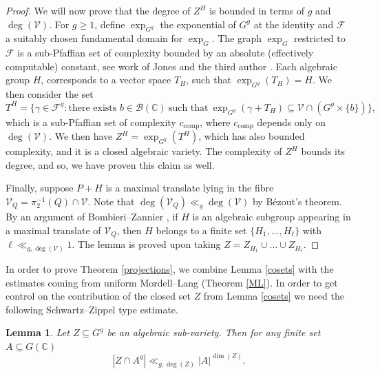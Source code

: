 \documentclass[12pt, reqno]{amsart}
\newcommand{\C}{\mathbb{C}}
\newtheorem{lem}[theorem]{Lemma}
\theoremstyle{remark}
\theoremstyle{definition}
\numberwithin{equation}{section}
\begin{document}
\begin{proof}
We will now prove that the degree of $Z^H$ is bounded in terms of $g$ and $\deg(\mathcal{V})$. For $g \geq 1$,  define $\exp_{G^g}$ the exponential of $G^g$ at the identity and $\mathcal{F}$ a suitably chosen fundamental domain for $\exp_G$. The graph $\exp_G$ restricted to $\mathcal{F}$ is a sub-Pfaffian set of complexity bounded by an absolute (effectively computable) constant, see work of Jones and the third author \cite{pfaffian}. Each algebraic group $H$, corresponds to a vector space $T_H$, such that $\exp_{G^g}(T_H) = H$. We then consider the set 
$$T^H = \{\gamma \in \mathcal{F}^g : \text{there exists } b \in \mathcal{B}(\C) \ \text{such that} \ \exp_{G^g}(\gamma  + T_H) \subseteq \mathcal{V} \cap ( G^g \times \{b\}) \},$$
which is a sub-Pfaffian set of complexity $c_{\text{comp}}$, where $c_{\text{comp}}$ depends only on $\deg(\mathcal{V})$.  We then have 
$Z^H = \exp_{G^{g}}(T^H)$, which has also bounded complexity, and it is a closed algebraic variety. The complexity of $Z^H$ bounds its degree, and so, we have proven this claim as well.

Finally, suppose $P + H$ is a maximal translate lying in the fibre $\mathcal{V}_Q = \pi_2^{-1}(Q)\cap \mathcal{V}$. Note that $\deg(\mathcal{V}_Q) \ll_g \deg(\mathcal{V})$ by B{\' e}zout's theorem. By an argument of Bombieri--Zannier \cite[Lemma 2]{Bombieri--Zannier}, if $H$ is an algebraic subgroup appearing in a maximal translate of $\mathcal{V}_Q$, then $H$ belongs to a finite set $\{H_1, \dots, H_\ell\}$ with $\ell \ll_{g, \deg(\mathcal{V})} 1$. The lemma is proved upon taking $Z = Z_{H_1} \cup \dots \cup Z_{H_\ell}$.
\end{proof}
In order to prove Theorem \ref{projections}, we combine Lemma \ref{cosets} with the estimates coming from uniform Mordell--Lang (Theorem \ref{ML}). In order to get control on the contribution of the closed set $Z$ from Lemma \ref{cosets}  we need the following Schwartz--Zippel type estimate. 
\begin{lem}\label{lemmaexception} Let $Z \subseteq G^g$ be an algebraic sub-variety. Then for any finite set $A \subseteq G(\C)$
$$|Z \cap A^{g}|\ll_{g, \deg(Z)}|A|^{\dim(Z)}.  $$
\end{lem}
\end{document}
